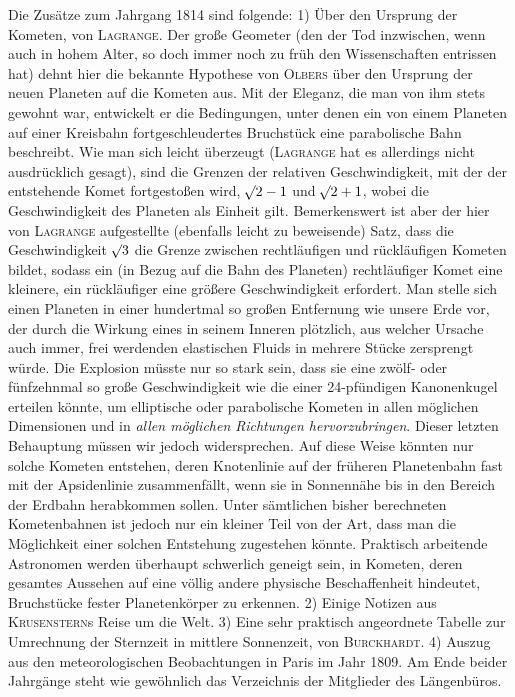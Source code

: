 Die Zusätze zum Jahrgang 1814 sind folgende: 1) Über den Ursprung der Kometen, von \textsc{Lagrange}. Der große Geometer (den der Tod inzwischen, wenn auch in hohem Alter, so doch immer noch zu früh den Wissenschaften entrissen hat) dehnt hier die bekannte Hypothese von \textsc{Olbers} über den Ursprung der neuen Planeten auf die Kometen aus. Mit der Eleganz, die man von ihm stets gewohnt war, entwickelt er die Bedingungen, unter denen ein von einem Planeten auf einer Kreisbahn fortgeschleudertes Bruchstück eine parabolische Bahn beschreibt. Wie man sich leicht überzeugt (\textsc{Lagrange} hat es allerdings nicht ausdrücklich gesagt), sind die Grenzen der relativen Geschwindigkeit, mit der der entstehende Komet fortgestoßen wird, $\mathord{{}^{}\!\surd}2-1$ und $\mathord{{}^{}\!\surd}2+1$, wobei die Geschwindigkeit des Planeten als Einheit gilt. Bemerkenswert ist aber der hier von \textsc{Lagrange} aufgestellte (ebenfalls leicht zu beweisende) Satz, dass die Geschwindigkeit $\mathord{{}^{}\!\surd}3$ die Grenze zwischen rechtläufigen und rückläufigen Kometen bildet, sodass ein (in Bezug auf die Bahn des Planeten) rechtläufiger Komet eine kleinere, ein rückläufiger eine größere Geschwindigkeit erfordert. Man stelle sich einen Planeten in einer hundertmal so großen Entfernung wie unsere Erde vor, der durch die Wirkung eines in seinem Inneren plötzlich, aus welcher Ursache auch immer, frei werdenden elastischen Fluids in mehrere Stücke zersprengt würde. Die Explosion müsste nur so stark sein, dass sie eine zwölf- oder fünfzehnmal so große Geschwindigkeit wie die einer 24-pfündigen Kanonenkugel erteilen könnte, um elliptische oder parabolische Kometen in allen möglichen Dimensionen und in \emph{allen möglichen Richtungen hervorzubringen}. Dieser letzten Behauptung müssen wir jedoch widersprechen. Auf diese Weise könnten nur solche Kometen entstehen, deren Knotenlinie auf der früheren Planetenbahn fast mit der Apsidenlinie zusammenfällt, wenn sie in Sonnennähe bis in den Bereich der Erdbahn herabkommen sollen. Unter sämtlichen bisher berechneten Kometenbahnen ist jedoch nur ein kleiner Teil von der Art, dass man die Möglichkeit einer solchen Entstehung zugestehen könnte. Praktisch arbeitende Astronomen werden überhaupt schwerlich geneigt sein, in Kometen, deren gesamtes Aussehen auf eine völlig andere physische Beschaffenheit hindeutet, Bruchstücke fester Planetenkörper zu erkennen. 2) Einige Notizen aus \textsc{Krusenstern}s Reise um die Welt. 3) Eine sehr praktisch angeordnete Tabelle zur Umrechnung der Sternzeit in mittlere Sonnenzeit, von \textsc{Burckhardt}. 4) Auszug aus den meteorologischen Beobachtungen in Paris im Jahr 1809. Am Ende beider Jahrgänge steht wie gewöhnlich das Verzeichnis der Mitglieder des Längenbüros.
